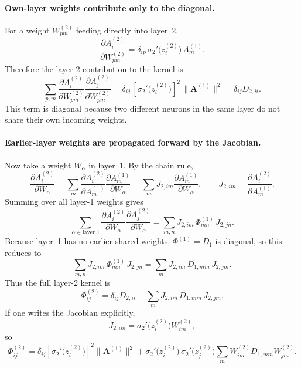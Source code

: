 \documentclass[10pt]{article}
\newcommand{\vA}{\mathbf{A}}
\begin{document}
\paragraph{Own-layer weights contribute only to the diagonal.}
For a weight $W_{pm}^{(2)}$ feeding directly into layer~2,
\[
  \frac{\partial A_i^{(2)}}{\partial W_{pm}^{(2)}}
  =
  \delta_{ip}\,\sigma_2'\!\bigl(z_i^{(2)}\bigr)\,A_m^{(1)}.
\]
Therefore the layer-2 contribution to the kernel is
\[
  \sum_{p,m}
  \frac{\partial A_i^{(2)}}{\partial W_{pm}^{(2)}}
  \frac{\partial A_j^{(2)}}{\partial W_{pm}^{(2)}}
  =
  \delta_{ij}\,[\sigma_2'\!\bigl(z_i^{(2)}\bigr)]^2\,\lVert \vA^{(1)} \rVert^2
  =
  \delta_{ij} D_{2,ii}.
\]
This term is diagonal because two different neurons in the same layer do not share their own incoming weights.

\paragraph{Earlier-layer weights are propagated forward by the Jacobian.}
Now take a weight $W_\alpha$ in layer~1.  By the chain rule,
\[
  \frac{\partial A_i^{(2)}}{\partial W_\alpha}
  =
  \sum_m
  \frac{\partial A_i^{(2)}}{\partial A_m^{(1)}}
  \frac{\partial A_m^{(1)}}{\partial W_\alpha}
  =
  \sum_m J_{2,im}
  \frac{\partial A_m^{(1)}}{\partial W_\alpha},
  \qquad
  J_{2,im} = \frac{\partial A_i^{(2)}}{\partial A_m^{(1)}}.
\]
Summing over all layer-1 weights gives
\[
  \sum_{\alpha\in\text{layer }1}
  \frac{\partial A_i^{(2)}}{\partial W_\alpha}
  \frac{\partial A_j^{(2)}}{\partial W_\alpha}
  =
  \sum_{m,n} J_{2,im}\,\Phi_{mn}^{(1)}\,J_{2,jn}.
\]
Because layer~1 has no earlier shared weights, $\Phi^{(1)} = D_1$ is diagonal, so this reduces to
\[
  \sum_{m,n} J_{2,im}\,\Phi_{mn}^{(1)}\,J_{2,jn}
  =
  \sum_m J_{2,im}\,D_{1,mm}\,J_{2,jm}.
\]
Thus the full layer-2 kernel is
\[
  \Phi_{ij}^{(2)}
  =
  \delta_{ij} D_{2,ii}
  +
  \sum_m J_{2,im}\,D_{1,mm}\,J_{2,jm}.
\]
If one writes the Jacobian explicitly,
\[
  J_{2,im} = \sigma_2'\!\bigl(z_i^{(2)}\bigr) W_{im}^{(2)},
\]
so
\[
  \Phi_{ij}^{(2)}
  =
  \delta_{ij} [\sigma_2'\!\bigl(z_i^{(2)}\bigr)]^2 \lVert \vA^{(1)} \rVert^2
  +
  \sigma_2'\!\bigl(z_i^{(2)}\bigr)\,\sigma_2'\!\bigl(z_j^{(2)}\bigr)
  \sum_m W_{im}^{(2)} D_{1,mm} W_{jm}^{(2)}.
\]
\end{document}
